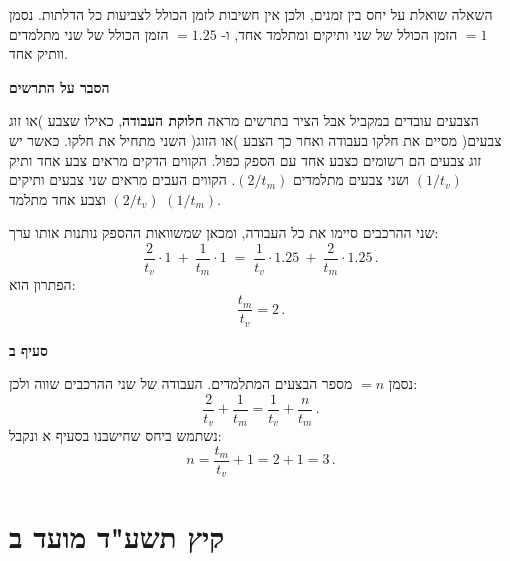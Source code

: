 השאלה שואלת על יחס בין זמנים, ולכן אין חשיבות לזמן הכולל לצביעות כל הדלתות. 
נסמן
$=1$
הזמן הכולל של שני ותיקים ומתלמד אחד, ו-%
$=1.25$
הזמן הכולל של שני מתלמדים וותיק אחד.

\smallskip

\noindent\textbf{הסבר על התרשים}

הצבעים עובדים במקביל אבל הציר בתרשים מראה
\textbf{חלוקת העבודה},
כאילו שצבע )או זוג צבעים( מסיים את חלקו בעבודה ואחר כך הצבע )או הזוג( השני מתחיל את חלקו. כאשר יש זוג צבעים הם רשומים כצבע אחד עם הספק כפול. הקווים הדקים מראים צבע אחד ותיק 
$(1/t_v)$
ושני צבעים מתלמדים
$(2/t_m)$.
הקווים העבים מראים שני צבעים ותיקים
$(2/t_v)$
וצבע אחד מתלמד
$(1/t_m)$.

\np

שני ההרכבים סיימו את כל העבודה, ומכאן שמשוואות ההספק נותנות אותו ערך:
\[
\frac{2}{t_v}\cdot 1 \:+\: \frac{1}{t_m}\cdot 1 \;=\; \frac{1}{t_v}\cdot 1.25 \:+\: \frac{2}{t_m} \cdot 1.25 \,.
\]
הפתרון הוא:
\[
\frac{t_m}{t_v}=2\,.
\]

\textbf{סעיף ב}

\begin{center}
\end{center}

נסמן
$=n$
מספר הבצעים המתלמדים. העבודה של שני ההרכבים שווה ולכן:
\[
\frac{2}{t_v} + \frac{1}{t_m} = \frac{1}{t_v} + \frac{n}{t_m}\,.
\]
נשתמש ביחס שחישבנו בסעיף א ונקבל:
\[
n = \frac{t_m}{t_v}+1 = 2+1=3\,.
\]


\np

\section{קיץ תשע"ד מועד ב}


